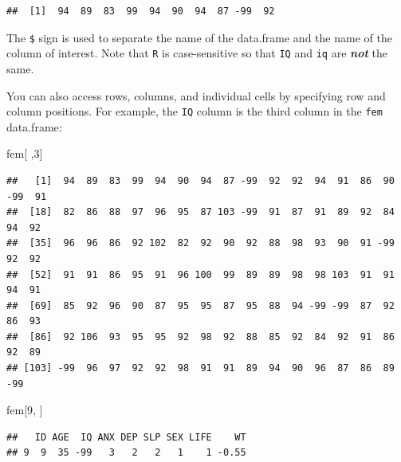 \documentclass[]{book}
\newenvironment{Shaded}{\begin{snugshade}}{\end{snugshade}}
\newcommand{\DecValTok}[1]{\textcolor[rgb]{0.00,0.00,0.81}{#1}}
\newcommand{\OperatorTok}[1]{\textcolor[rgb]{0.81,0.36,0.00}{\textbf{#1}}}
\newcommand{\NormalTok}[1]{#1}
\theoremstyle{definition}
\theoremstyle{definition}
\theoremstyle{definition}
\theoremstyle{remark}
\begin{document}
\begin{Shaded}
\end{Shaded}

\begin{verbatim}
##  [1]  94  89  83  99  94  90  94  87 -99  92
\end{verbatim}

The \texttt{\$} sign is used to separate the name of the data.frame and
the name of the column of interest. Note that \texttt{R} is
case-sensitive so that \texttt{IQ} and \texttt{iq} are
\textbf{\emph{not}} the same.

You can also access rows, columns, and individual cells by specifying
row and column positions. For example, the \texttt{IQ} column is the
third column in the \texttt{fem} data.frame:

\begin{Shaded}
\begin{Highlighting}[]
\NormalTok{fem[ ,}\DecValTok{3}\NormalTok{]}
\end{Highlighting}
\end{Shaded}

\begin{verbatim}
##   [1]  94  89  83  99  94  90  94  87 -99  92  92  94  91  86  90 -99  91
##  [18]  82  86  88  97  96  95  87 103 -99  91  87  91  89  92  84  94  92
##  [35]  96  96  86  92 102  82  92  90  92  88  98  93  90  91 -99  92  92
##  [52]  91  91  86  95  91  96 100  99  89  89  98  98 103  91  91  94  91
##  [69]  85  92  96  90  87  95  95  87  95  88  94 -99 -99  87  92  86  93
##  [86]  92 106  93  95  95  92  98  92  88  85  92  84  92  91  86  92  89
## [103] -99  96  97  92  92  98  91  91  89  94  90  96  87  86  89 -99
\end{verbatim}

\begin{Shaded}
\begin{Highlighting}[]
\NormalTok{fem[}\DecValTok{9}\NormalTok{, ]}
\end{Highlighting}
\end{Shaded}

\begin{verbatim}
##   ID AGE  IQ ANX DEP SLP SEX LIFE    WT
## 9  9  35 -99   3   2   2   1    1 -0.55
\end{verbatim}
\end{document}
